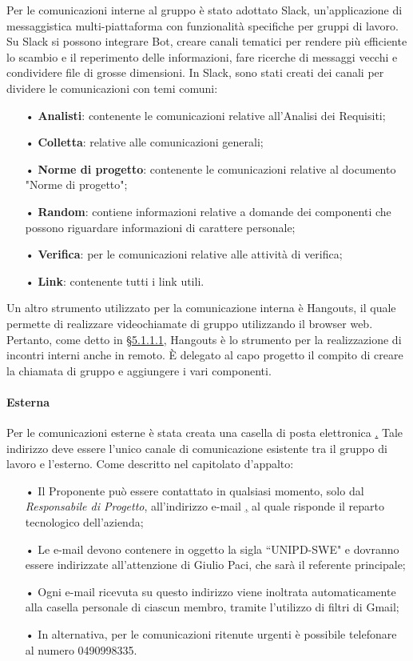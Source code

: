 Per le comunicazioni interne al gruppo è stato adottato {Slack}, un'applicazione di messaggistica multi-piattaforma con funzionalità specifiche per gruppi di lavoro.  
\newline
Su Slack si possono integrare {Bot}, creare canali tematici per rendere più efficiente lo scambio e il reperimento delle informazioni, fare ricerche di messaggi vecchi e condividere file di grosse dimensioni.   
\newline
In Slack, sono stati creati dei canali per dividere le comunicazioni con temi comuni:
\begin{itemize}
\item[•] \textbf{Analisti}: contenente le comunicazioni relative all'Analisi dei Requisiti;
\item[•] \textbf{Colletta}: relative alle comunicazioni generali;
\item[•] \textbf{Norme di progetto}: contenente le comunicazioni relative al documento "Norme di progetto";
\item[•] \textbf{Random}: contiene informazioni relative a domande dei componenti che possono riguardare informazioni di carattere personale;
\item[•] \textbf{Verifica}: per le comunicazioni relative alle attività di verifica;
\item[•] \textbf{Link}: contenente tutti i link utili.
\end{itemize}
Un altro strumento utilizzato per la comunicazione interna è Hangouts, il quale permette di realizzare videochiamate di gruppo utilizzando il browser web. Pertanto, come detto in \hyperref[sec:interni]{§5.1.1.1}, Hangouts è lo strumento per la realizzazione di incontri interni anche in remoto. \uppercase{è} delegato al capo progetto il compito di creare la chiamata di gruppo e aggiungere i vari componenti.
\paragraph{Esterna}
Per le comunicazioni esterne è stata creata una casella di posta elettronica \href{SWEight@gmail.com}.
\newline 
Tale indirizzo deve essere l'unico canale di comunicazione esistente tra il gruppo di lavoro e l'esterno. 
\newline
Come descritto nel capitolato d'appalto: 
\begin{itemize}
\item[•] Il Proponente può essere contattato in qualsiasi momento, solo dal \textit{Responsabile di Progetto}, all'indirizzo e-mail \href{tech@mivoq.it} , al quale risponde il reparto tecnologico dell'azienda;
\item[•] Le e-mail devono contenere in oggetto la sigla “UNIPD-SWE" e dovranno essere indirizzate all'attenzione di Giulio Paci, che sarà il referente principale;
\item[•] Ogni e-mail ricevuta su questo indirizzo viene inoltrata automaticamente alla casella personale di ciascun membro, tramite l'utilizzo di filtri di Gmail;
\item[•] In alternativa, per le comunicazioni ritenute urgenti è possibile telefonare al numero 0490998335.
\end{itemize}

